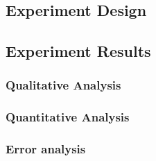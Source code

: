 \subsection{Experiment Design}

\subsection{Experiment Results}

\subsubsection{Qualitative Analysis}


\subsubsection{Quantitative Analysis}


\subsubsection{Error analysis}

